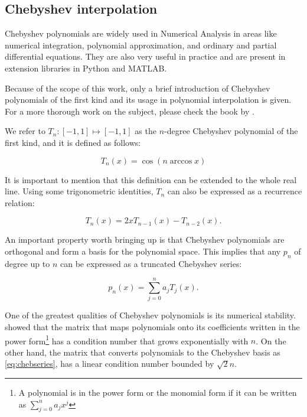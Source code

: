 \subsection{Chebyshev interpolation}

Chebyshev polynomials are widely used in Numerical Analysis in areas like numerical integration, polynomial approximation, and ordinary and partial differential equations.
They are also very useful in practice and are present in extension libraries in Python and MATLAB.

Because of the scope of this work, only a brief introduction of Chebyshev polynomials of the first kind and its usage in polynomial interpolation is given. For a more thorough work on the subject, please check the book by .

We refer to $T_n : [-1, 1] \mapsto [-1, 1]$ as the $n$-degree Chebyshev polynomial of the first kind, and it is defined as follows:

\begin{equation}
T_n(x) = \cos({n\arccos x})
\end{equation}

It is important to mention that this definition can be extended to the whole real line. Using some trigonometric identities, $T_n$ can also be expressed as a recurrence relation:

\begin{equation}
T_n(x) = 2xT_{n-1}(x) - T_{n-2}(x).
\end{equation}

An important property worth bringing up is that Chebyshev polynomials are orthogonal and form a basis for the polynomial space. This implies that any $p_n$ of degree up to $n$ can be expressed as a truncated Chebyshev series:

\begin{equation}\label{eq:chebseries}
p_n(x) = \sum_{j=0}^{n} a_j T_j(x).
\end{equation}

One of the greatest qualities of Chebyshev polynomials is its numerical stability.  showed that the matrix that maps polynomials onto its coefficients written in the power form\footnote{A polynomial is in the power form or the monomial form if it can be written as $\sum_{j=0}^{n}a_jx^j$} has a condition number that grows exponentially with $n$. On the other hand, the matrix that converts polynomials to the Chebyshev basis as \autoref{eq:chebseries}, has a linear condition number bounded by $\sqrt{2}n$.

